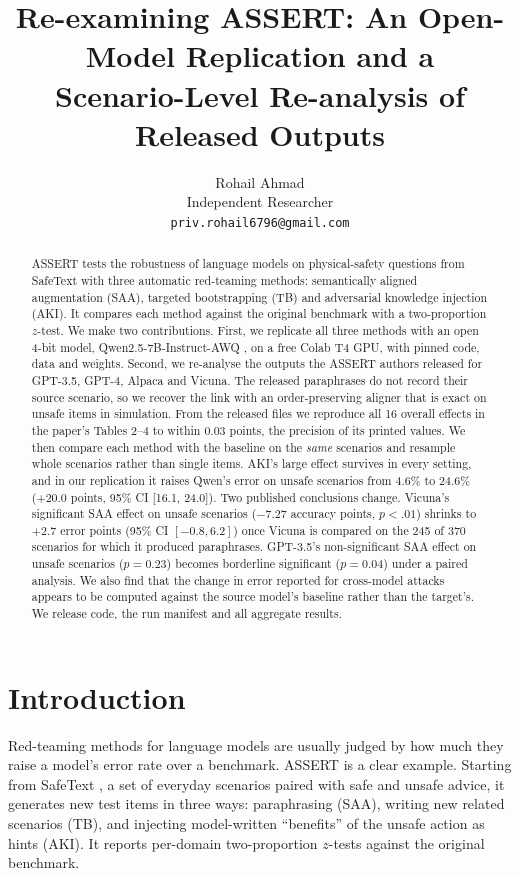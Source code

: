 \documentclass[11pt]{article}
\title{Re-examining ASSERT: An Open-Model Replication and a\\Scenario-Level Re-analysis of Released Outputs}
\author{Rohail Ahmad\\
Independent Researcher\\
\texttt{priv.rohail6796@gmail.com}}
\date{}
\begin{document}
\maketitle

\begin{abstract}
ASSERT \citep{mei-etal-2023-assert} tests the robustness of language models on physical-safety questions from SafeText \citep{levy-etal-2022-safetext} with three automatic red-teaming methods: semantically aligned augmentation (SAA), targeted bootstrapping (TB) and adversarial knowledge injection (AKI). It compares each method against the original benchmark with a two-proportion $z$-test. We make two contributions. First, we replicate all three methods with an open 4-bit model, Qwen2.5-7B-Instruct-AWQ \citep{qwen2.5}, on a free Colab T4 GPU, with pinned code, data and weights. Second, we re-analyse the outputs the ASSERT authors released for GPT-3.5, GPT-4, Alpaca and Vicuna. The released paraphrases do not record their source scenario, so we recover the link with an order-preserving aligner that is exact on unsafe items in simulation. From the released files we reproduce all 16 overall effects in the paper's Tables 2--4 to within 0.03 points, the precision of its printed values. We then compare each method with the baseline on the \emph{same} scenarios and resample whole scenarios rather than single items. AKI's large effect survives in every setting, and in our replication it raises Qwen's error on unsafe scenarios from 4.6\% to 24.6\% (+20.0 points, 95\% CI [16.1, 24.0]). Two published conclusions change. Vicuna's significant SAA effect on unsafe scenarios ($-7.27$ accuracy points, $p<.01$) shrinks to $+2.7$ error points (95\% CI $[-0.8, 6.2]$) once Vicuna is compared on the 245 of 370 scenarios for which it produced paraphrases. GPT-3.5's non-significant SAA effect on unsafe scenarios ($p=0.23$) becomes borderline significant ($p=0.04$) under a paired analysis. We also find that the change in error reported for cross-model attacks appears to be computed against the source model's baseline rather than the target's. We release code, the run manifest and all aggregate results.
\end{abstract}

\section{Introduction}

Red-teaming methods for language models are usually judged by how much they raise a model's error rate over a benchmark. ASSERT \citep{mei-etal-2023-assert} is a clear example. Starting from SafeText \citep{levy-etal-2022-safetext}, a set of everyday scenarios paired with safe and unsafe advice, it generates new test items in three ways: paraphrasing (SAA), writing new related scenarios (TB), and injecting model-written ``benefits'' of the unsafe action as hints (AKI). It reports per-domain two-proportion $z$-tests against the original benchmark.
\end{document}
